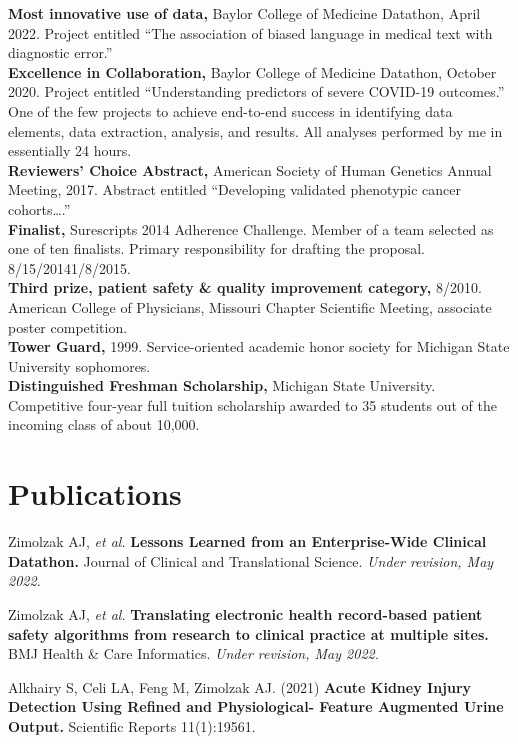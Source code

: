\documentclass[10pt]{article}
\begin{document}
\textbf{Most innovative use of data,} Baylor College of Medicine
Datathon, April 2022. Project entitled ``The association of biased
language in medical text with diagnostic error.''\\
\textbf{Excellence in Collaboration,} Baylor College of Medicine
Datathon, October 2020. Project entitled ``Understanding predictors of
severe COVID-19 outcomes.'' One of the few projects to achieve
end-to-end success in identifying data elements, data extraction,
analysis, and results. All analyses performed by me in essentially 24
hours.\\
\textbf{Reviewers' Choice Abstract,} American Society of Human
Genetics Annual Meeting, 2017. Abstract entitled ``Developing
validated phenotypic cancer cohorts\ldots{}.''\\
\textbf{Finalist,} Surescripts 2014 Adherence Challenge. Member of a
team selected as one of ten finalists. Primary responsibility for
drafting the proposal. 8/15/2014\ndash{}1/8/2015.\\
\textbf{Third prize, patient safety \& quality improvement category,}
8/2010. American College of Physicians, Missouri Chapter Scientific
Meeting, associate poster competition.\\
\textbf{Tower Guard,} 1999. Service-oriented academic honor
society for Michigan State University sophomores.\\
\textbf{Distinguished Freshman Scholarship,} Michigan State
University. Competitive four-year full tuition scholarship awarded to
35 students out of the incoming class of about 10,000.




\section*{Publications}


Zimolzak AJ, \emph{et al.} \textbf{Lessons Learned from an
  Enterprise-Wide Clinical Datathon.} Journal of Clinical and
Translational Science. \emph{Under revision, May 2022.}

Zimolzak AJ, \emph{et al.} \textbf{Translating electronic health
  record-based patient safety algorithms from research to clinical
  practice at multiple sites.} BMJ Health \& Care Informatics.
\emph{Under revision, May 2022.}

Alkhairy S, Celi LA, Feng M, Zimolzak AJ. (2021) \textbf{Acute Kidney Injury
Detection Using Refined and Physiological- Feature Augmented Urine
Output.} Scientific Reports 11(1):19561.
\end{document}
